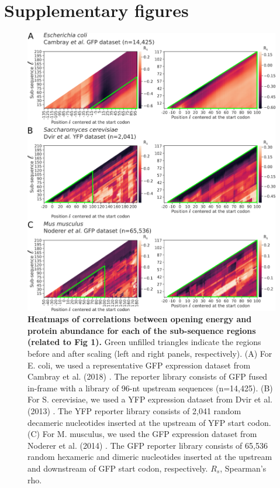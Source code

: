 \section{Supplementary figures}
\begin{figure}[htbp!]
	\center
	\includegraphics[width=1\textwidth]{appendix/TIsigner/Figs/S6.png}
	\caption[Heatmaps of correlations between opening energy and protein abundance for each of the sub-sequence regions (related to Fig 1).]{\textbf{Heatmaps of correlations between opening energy and protein abundance for each of the sub-sequence regions (related to Fig 1).} Green unfilled triangles indicate the regions before and after scaling (left and right panels, respectively). (A) For E. coli, we used a representative GFP expression dataset from Cambray et al. (2018) \cite{Cambray2018-kn}. The reporter library consists of GFP fused in-frame with a library of 96-nt upstream sequences (n=14,425). (B) For S. cerevisiae, we used a YFP expression dataset from Dvir et al. (2013) \cite{Dvir2013-zt}. The YFP reporter library consists of 2,041 random decameric nucleotides inserted at the upstream of YFP start codon. (C) For M. musculus, we used the GFP expression dataset from Noderer et al. (2014) \cite{Noderer2014-aq}. The GFP reporter library consists of 65,536 random hexameric and dimeric nucleotides inserted at the upstream and downstream of GFP start codon, respectively. $R_s$, Spearman’s rho.
	}%
	\label{fig:appendix_TIsigner_S6}
\end{figure}

